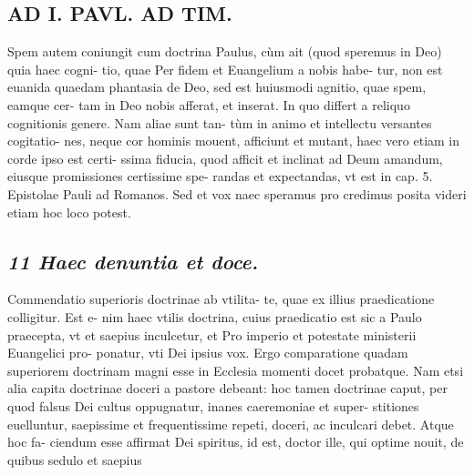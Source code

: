 \documentclass{article}
\begin{document}
\begin{pages}
\section*{AD I. PAVL. AD TIM. }
\marginpar{[ p.226 ]}\pstart Spem autem coniungit cum doctrina Paulus, cùm ait (quod speremus in Deo) quia haec cogni- tio, quae Per fidem et Euangelium a nobis habe- tur, non est euanida quaedam phantasia de Deo, sed est huiusmodi agnitio, quae spem, eamque  cer- tam in Deo nobis afferat, et inserat. In quo differt a reliquo cognitionis genere. Nam aliae sunt tan- tùm in animo et intellectu versantes cogitatio- nes, neque cor hominis mouent, afficiunt et mutant, haec vero etiam in corde ipso est certi- ssima fiducia, quod afficit et inclinat ad Deum amandum, eiusque promissiones certissime spe- randas et expectandas, vt est in cap. 5. Epistolae Pauli ad Romanos. Sed et vox naec speramus pro credimus posita videri etiam hoc loco potest.  \pend
{}
{}
\subsection*{\textit{11 Haec denuntia et doce. }}\pstart Commendatio superioris doctrinae ab vtilita- te, quae ex illius praedicatione colligitur. Est e- nim haec vtilis doctrina, cuius praedicatio est sic a Paulo praecepta, vt et saepius inculcetur, et Pro imperio et potestate ministerii Euangelici pro- ponatur, vti Dei ipsius vox. Ergo comparatione quadam superiorem doctrinam magni esse in Ecclesia momenti docet probatque. Nam etsi alia capita doctrinae doceri a pastore debeant: hoc tamen doctrinae caput, per quod falsus Dei cultus oppugnatur, inanes caeremoniae et super- stitiones euelluntur, saepissime et frequentissime repeti, doceri, ac inculcari debet. Atque hoc fa- ciendum esse affirmat Dei spiritus, id est, doctor ille, qui optime nouit, de quibus sedulo et saepius  \pend

\end{pages}
\end{document}

